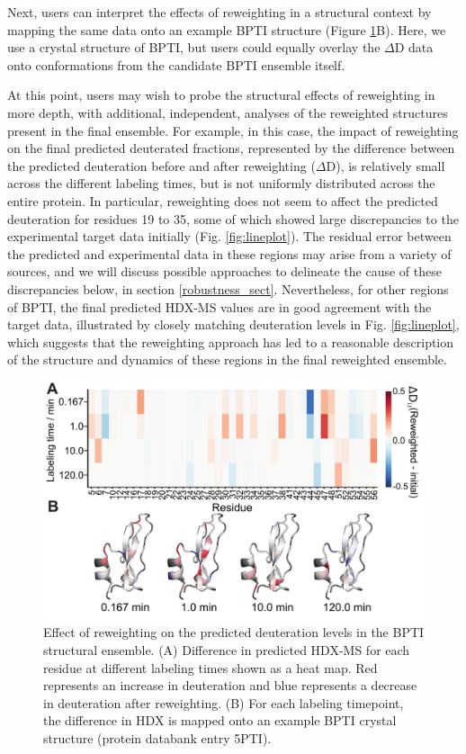 \documentclass[9pt,tutorial]{livecoms}
\begin{document}
Next, users can interpret the effects of reweighting in a structural context by mapping the same data onto an example BPTI structure (Figure \ref{fig:heatmap}B).
Here, we use a crystal structure of BPTI, but users could equally overlay the $\Delta$D data onto conformations from the candidate BPTI ensemble itself.

At this point, users may wish to probe the structural effects of reweighting in more depth, with additional, independent, analyses of the reweighted structures present in the final ensemble. 
For example, in this case, the impact of reweighting on the final predicted deuterated fractions, represented by the difference between the predicted deuteration before and after reweighting ($\Delta$D), is relatively small across the different labeling times, but is not uniformly distributed across the entire protein. 
In particular, reweighting does not seem to affect the predicted deuteration for residues 19 to 35, some of which showed large discrepancies to the experimental target data initially (Fig. \ref{fig:lineplot}). 
The residual error between the predicted and experimental data in these regions may arise from a variety of sources, and we will discuss possible approaches to delineate the cause of these discrepancies below, in section \ref{robustness_sect}.
Nevertheless, for other regions of BPTI, the final predicted HDX-MS values are in good agreement with the target data, illustrated by closely matching deuteration levels in Fig. \ref{fig:lineplot}, which suggests that the reweighting approach has led to a reasonable description of the structure and dynamics of these regions in the final reweighted ensemble.

\begin{figure}[t]
    \centering
    \includegraphics[width=0.9\linewidth]{Fig6_heatmap+structures_2col.png}
    \caption{Effect of reweighting on the predicted deuteration levels in the BPTI structural ensemble. (A) Difference in predicted HDX-MS for each residue at different labeling times shown as a heat map. Red represents an increase in deuteration and blue represents a decrease in deuteration after reweighting. (B) For each labeling timepoint, the difference in HDX is mapped onto an example BPTI crystal structure (protein databank entry 5PTI).}
    \label{fig:heatmap}
\end{figure}
\end{document}
